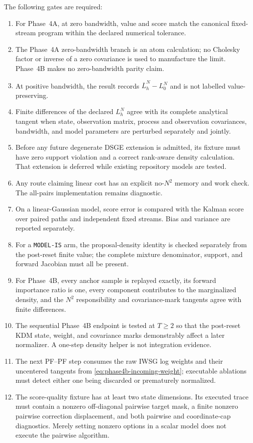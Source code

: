 \documentclass[11pt]{article}
\begin{document}
The following gates are required:
\begin{enumerate}[leftmargin=2em]
  \item For Phase~4A, at zero bandwidth, value and score match the canonical
        fixed-stream program within the declared numerical tolerance.
  \item The Phase~4A zero-bandwidth branch is an atom calculation; no Cholesky
        factor or inverse of a zero covariance is used to manufacture the
        limit.  Phase~4B makes no zero-bandwidth parity claim.
  \item At positive bandwidth, the result records
        $\overline L_h^N-L_0^N$ and is not labelled value-preserving.
  \item Finite differences of the declared $L_h^N$ agree with its complete
        analytical tangent when state, observation matrix, process and
        observation covariances, bandwidth, and model parameters are
        perturbed separately and jointly.
  \item Before any future degenerate DSGE extension is admitted, its fixture
        must have zero support violation and a correct rank-aware density
        calculation.  That extension is deferred while existing repository
        models are tested.
  \item Any route claiming linear cost has an explicit no-$N^2$ memory and
        work check.  The all-pairs implementation remains diagnostic.
  \item On a linear-Gaussian model, score error is compared with the Kalman
        score over paired paths and independent fixed streams.  Bias and
        variance are reported separately.
  \item For a \texttt{MODEL-IS} arm, the proposal-density identity is checked
        separately from the post-reset finite value; the complete mixture
        denominator, support, and forward Jacobian must all be present.
  \item For Phase~4B, every anchor sample is replayed exactly, its forward
        importance ratio is one, every component contributes to the
        marginalized density, and the $N^2$ responsibility and covariance-mark
        tangents agree with finite differences.
  \item The sequential Phase~4B endpoint is tested at $T\ge2$ so that the
        post-reset KDM state, weight, and covariance marks demonstrably affect
        a later normalizer.  A one-step density helper is not integration
        evidence.
  \item The next PF--PF step consumes the raw IWSG log weights and their
        uncentered tangents from \eqref{eq:phase4b-incoming-weight}; executable
        ablations must detect either one being discarded or prematurely
        normalized.
  \item The score-quality fixture has at least two state dimensions.  Its
        executed trace must contain a nonzero off-diagonal pairwise target mask,
        a finite nonzero pairwise correction displacement, and both pairwise and
        coordinate-cap diagnostics.  Merely setting nonzero options in a scalar
        model does not execute the pairwise algorithm.
\end{enumerate}
\end{document}
